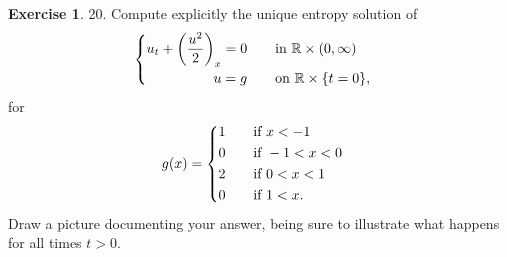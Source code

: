 \documentclass[a4paper]{book}
\numberwithin{equation}{chapter}
\theoremstyle{definition}
\newtheorem{exc}[exm]{Exercise}
\begin{document}
\begin{exc}
  20.  Compute explicitly the unique entropy solution of
  \begin{equation*}
    \begin{cases}
      \begin{aligned}
        u_t + \left( \frac{u^2}{2} \right)_x = 0 \qquad& \textmd{in } \mathbb{R} \times (0, \infty) \\
        u = g \qquad& \textmd{on } \mathbb{R} \times \{t = 0\},
      \end{aligned}
    \end{cases}
  \end{equation*}
  for
  \begin{equation*}
    g(x) = 
    \begin{cases}
      \begin{aligned}
        1 & \qquad \textmd{if } x < -1 \\
        0 & \qquad \textmd{if } -1 < x < 0 \\
        2 & \qquad \textmd{if } 0 < x < 1 \\
        0 & \qquad \textmd{if } 1 < x.
      \end{aligned}
    \end{cases}
  \end{equation*}
  Draw a picture documenting your answer, being sure to illustrate what happens for all times $ t > 0$.
\end{exc}
\end{document}
